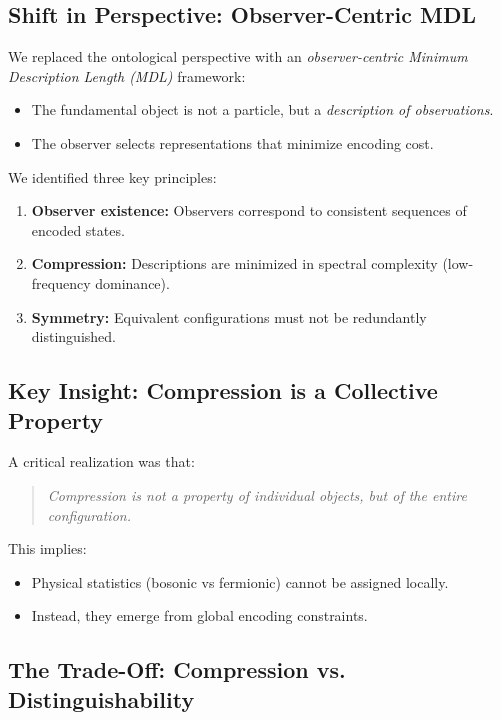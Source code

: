 \documentclass[11pt]{article}
\begin{document}
\subsection{Shift in Perspective: Observer-Centric MDL}

We replaced the ontological perspective with an \emph{observer-centric Minimum Description Length (MDL)} framework:

\begin{itemize}
    \item The fundamental object is not a particle, but a \emph{description of observations}.
    \item The observer selects representations that minimize encoding cost.
\end{itemize}

We identified three key principles:

\begin{enumerate}
    \item \textbf{Observer existence:} Observers correspond to consistent sequences of encoded states.
    \item \textbf{Compression:} Descriptions are minimized in spectral complexity (low-frequency dominance).
    \item \textbf{Symmetry:} Equivalent configurations must not be redundantly distinguished.
\end{enumerate}

\subsection{Key Insight: Compression is a Collective Property}

A critical realization was that:

\begin{quote}
\emph{Compression is not a property of individual objects, but of the entire configuration.}
\end{quote}

This implies:
\begin{itemize}
    \item Physical statistics (bosonic vs fermionic) cannot be assigned locally.
    \item Instead, they emerge from global encoding constraints.
\end{itemize}

\subsection{The Trade-Off: Compression vs. Distinguishability}
\end{document}

